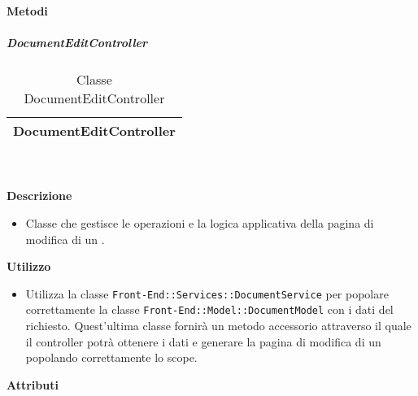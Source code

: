 		\textbf{Metodi} 
	\begin{itemize}
		\end{itemize}
			\subparagraph{DocumentEditController} 
\begin{table}[ht]
\begin{center}
\bgroup
	\setlength{\arrayrulewidth}{0.6mm}
	\def\arraystretch{1}
		\begin{tabular}{ | p{12cm} | }
				\hline  
					\centerline{\textbf{DocumentEditController}}
		\\ \hline 
				\hline
				\hline
		
		\end{tabular}
\egroup
\caption{Classe DocumentEditController}
\end{center}
\end{table}  \textbf{\\ \\ Descrizione} 
					\begin{itemize}
						\item[] Classe che gestisce le operazioni e la logica applicativa della pagina di modifica di un .
					\end{itemize}      
				\textbf{Utilizzo}  
					\begin{itemize}
						\item[] Utilizza la classe \texttt{Front-End::Services::DocumentService} per popolare correttamente la classe \texttt{Front-End::Model::DocumentModel} con i dati del  richiesto. Quest'ultima classe fornirà un metodo accessorio attraverso il quale il controller potrà ottenere i dati e generare la pagina di modifica di un  popolando correttamente lo scope.
					\end{itemize}
			 \textbf{Attributi} 
	\begin{itemize}
		\end{itemize}
		
